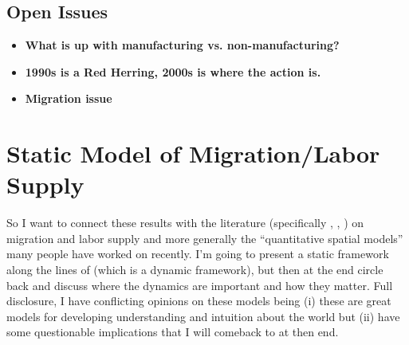 \documentclass[pdftex,12pt]{article}
\begin{document}
\subsection{Open Issues}

\begin{itemize}
\item \textbf{What is up with manufacturing vs. non-manufacturing?}

\item \textbf{1990s is a Red Herring, 2000s is where the action is.}

\item \textbf{Migration issue}
\end{itemize}

\newpage

\section{Static Model of Migration/Labor Supply}

\medskip
\noindent So I want to connect these results with the literature (specifically \citet{artucc2010trade}, \citet{caliendo2015trade}, \citet{galle2015slicing}) on migration and labor supply and more generally the ``quantitative spatial models'' many people have worked on recently. I'm going to present a static framework along the lines of \citet{caliendo2015trade} (which is a dynamic framework), but then at the end circle back and discuss where the dynamics are important and how they matter. Full disclosure, I have conflicting opinions on these models being (i) these are great models for developing understanding and intuition about the world but (ii) have some questionable implications that I will comeback to at then end.
\end{document}
